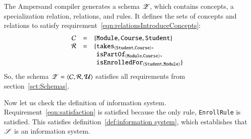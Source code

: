 \documentclass{elsarticle}
\begin{document}
   The Ampersand compiler generates a schema $\mathscr{Z}$, which contains concepts, a specialization relation, relations, and rules.
   It defines the sets of concepts and relations to satisfy requirement~\ref{eqn:relationsIntroduceConcepts}:
\[\begin{array}{rcl}
   \concepts&=&\{ {\tt Module}, {\tt Course}, {\tt Student}\}\\
   \rels&=&\{\begin{array}[t]{@{}l@{}}
               \declare{\tt takes}{\tt Student}{\tt Course},\\
               \declare{\tt isPartOf}{\tt Module}{\tt Course},\\
               \declare{\tt isEnrolledFor}{\tt Student}{\tt Module}\}
             \end{array}
  \end{array}
\]
   So, the schema $\mathscr{Z}=\langle{\mathcal{C}},{\mathcal{R}},{\mathcal{U}}\rangle$ satisfies all requirements from section~\ref{sct:Schemas}.

   Now let us check the definition of information system.
   Requirement~\ref{eqn:satisfaction} is satisfied because the only rule, {\tt EnrollRule} is satisfied.
   This satisfies definition~\ref{def:information system}, which establishes that $\mathscr{S}$ is an information system.

\end{document}

